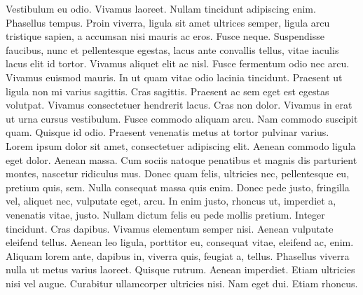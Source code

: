  Vestibulum eu odio. Vivamus laoreet. Nullam tincidunt adipiscing enim. Phasellus tempus. Proin viverra, ligula sit amet ultrices semper, ligula arcu tristique sapien, a accumsan nisi mauris ac eros. Fusce neque. Suspendisse faucibus, nunc et pellentesque egestas, lacus ante convallis tellus, vitae iaculis lacus elit id tortor. Vivamus aliquet elit ac nisl. Fusce fermentum odio nec arcu. Vivamus euismod mauris. In ut quam vitae odio lacinia tincidunt. Praesent ut ligula non mi varius sagittis. Cras sagittis. Praesent ac sem eget est egestas volutpat. Vivamus consectetuer hendrerit lacus. Cras non dolor. Vivamus in erat ut urna cursus vestibulum. Fusce commodo aliquam arcu. Nam commodo suscipit quam. Quisque id odio. Praesent venenatis metus at tortor pulvinar varius. Lorem ipsum dolor sit amet, consectetuer adipiscing elit. Aenean commodo ligula eget dolor. Aenean massa. Cum sociis natoque penatibus et magnis dis parturient montes, nascetur ridiculus mus. Donec quam felis, ultricies nec, pellentesque eu, pretium quis, sem. Nulla consequat massa quis enim. Donec pede justo, fringilla vel, aliquet nec, vulputate eget, arcu. In enim justo, rhoncus ut, imperdiet a, venenatis vitae, justo. Nullam dictum felis eu pede mollis pretium. Integer tincidunt. Cras dapibus. Vivamus elementum semper nisi. Aenean vulputate eleifend tellus. Aenean leo ligula, porttitor eu, consequat vitae, eleifend ac, enim. Aliquam lorem ante, dapibus in, viverra quis, feugiat a, tellus. Phasellus viverra nulla ut metus varius laoreet. Quisque rutrum. Aenean imperdiet. Etiam ultricies nisi vel augue. Curabitur ullamcorper ultricies nisi. Nam eget dui. Etiam rhoncus.

